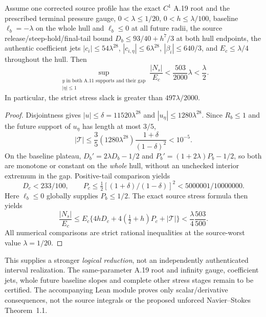 \begin{theorem}
\label{thm:A11-root-whole-hull-20261021}
Assume one corrected source profile has the exact $C^1$ A.19
root and the prescribed terminal pressure gauge, $0<\lambda\le1/20$,
$0<h\le\lambda/100$, baseline $\ell_b=-\lambda$ on the
whole hull and $\ell_b\le0$ at all future radii, the source
release/steep-hold/final-tail bound
$D_b\le93/40+h^7/3$ at both hull endpoints, the
authentic coefficient jets
$|c_i|\le54\lambda^{28}$,
$|c_{i,\eta}|\le6\lambda^{28}$,
$|\beta_i|\le640/3$, and $E_c\le\lambda/4$
throughout the hull. Then
\[
 \sup_{\substack{y\text{ in both A.11 supports and their gap}\\|\eta|\le1}}
 \frac{|N_s|}{E_c}
 <\frac{503}{2000}\lambda<\frac\lambda2.
\]
In particular, the strict stress slack is greater than
$497\lambda/2000$.
\end{theorem}
\begin{proof}
Disjointness gives $|u|\le\delta=11520\lambda^{28}$
and $|u_\eta|\le1280\lambda^{28}$. Since $R_b\le1$ and
the future support of $u_\eta$ has length at most $3/5$,
\[
 |\mathcal T|\le\frac35(1280\lambda^{28})
 \frac{1+\delta}{(1-\delta)^2}<10^{-5}.
\]
On the baseline plateau, $D_b'=2\lambda D_b-1/2$ and
$P_b'=(1+2\lambda)P_b-1/2$, so both are monotone or
constant on the \emph{whole} hull, without an unchecked
interior extremum in the gap. Positive-tail comparison yields
\[
D_c<233/100,\qquad
P_c\le\tfrac12[(1+\delta)/(1-\delta)]^2
 <5000001/10000000.
\]
Here $\ell_b\le0$ globally supplies $P_b\le1/2$.
The exact source stress formula then yields
\[
 \frac{|N_s|}{E_c}
 \le E_c\{4hD_c+4(\tfrac12+h)P_c+|\mathcal T|\}
 <\frac\lambda4\frac{503}{500}.
\]
All numerical comparisons are strict rational inequalities
at the source-worst value $\lambda=1/20$.
\end{proof}

This supplies a stronger \emph{logical reduction}, not
an independently authenticated interval realization.
The same-parameter A.19 root and infinity gauge, coefficient
jets, whole future baseline slopes and complete other stress
stages remain to be certified. The accompanying Lean module
proves only scalar/derivative consequences, not the source
integrals or the proposed unforced Navier--Stokes Theorem~1.1.
